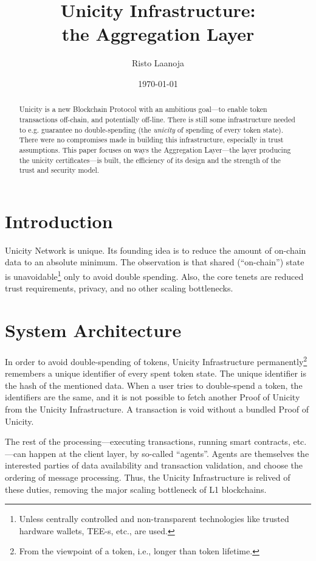 \documentclass[twocolumn]{article}
\title{Unicity Infrastructure:\\
    the Aggregation Layer}
\author[1]{Risto Laanoja}
\affil[1]{Unicity Labs}
\date{\today}
\begin{document}
\maketitle

\begin{abstract}
Unicity is a new Blockchain Protocol with an ambitious goal---to enable token transactions off-chain, and potentially off-line. There is still some infrastructure needed to e.g. guarantee no double-spending (the \textit{unicity} of spending of every token state). There were no compromises made in building this infrastructure, especially in trust assumptions. This paper focuses on ways the Aggregation Layer---the layer producing the unicity certificates---is built, the efficiency of its design and the strength of the trust and security model.
\end{abstract}


\section{Introduction}

Unicity Network is unique. Its founding idea is to reduce the amount of on-chain data to an absolute minimum. The observation is that shared (``on-chain'') state is unavoidable\footnote{Unless centrally controlled and non-transparent technologies like trusted hardware wallets, TEE-s, etc., are used.} only to avoid double spending. Also, the core tenets are reduced trust requirements, privacy, and no other scaling bottlenecks.


\section{System Architecture}


In order to avoid double-spending of tokens, Unicity Infrastructure permanently\footnote{From the viewpoint of a token, i.e., longer than token lifetime.} remembers a unique identifier of every spent token state. The unique identifier is the hash of the mentioned data. When a user tries to double-spend a token, the identifiers are the same, and it is not possible to fetch another Proof of Unicity from the Unicity Infrastructure. A transaction is void without a bundled Proof of Unicity.

The rest of the processing---executing transactions, running smart contracts, etc.---can happen at the client layer, by so-called ``agents''. Agents are themselves the interested parties of data availability and transaction validation, and choose the ordering of message processing. Thus, the Unicity Infrastructure is relived of these duties, removing the major scaling bottleneck of L1 blockchains.
\end{document}
